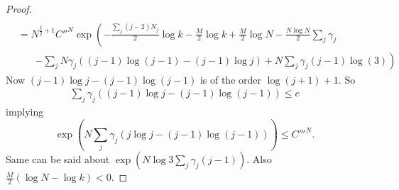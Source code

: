 \documentclass[12pt]{article}
\numberwithin{equation}{section}
\numberwithin{equation}{section}
\theoremstyle{definition}
\renewcommand{\1}{\bf 1}
\begin{document}
\begin{proof}
\begin{equation}
\begin{split}
\\
&= N^{\frac{\xi}{2}+1}  C''^{N} \exp\left(- \frac{\sum_{j}(j-2)N_{j}}{2}\log k - \frac{M}{2}\log k +\frac{M}{2}\log N - \frac{N\log N}{2} \sum_{j} \gamma_{j}\right.\\
&~~~~~~~~\left. - \sum_{j} N \gamma_{j}\left((j-1)\log(j-1) - (j-1)\log j  \right)  + N \sum_{j}\gamma_{j}(j-1)\log(3)\right)
\end{split}
\end{equation}
Now $(j-1)\log j -(j-1)\log(j-1)$ is of the order $\log(j+1) +1$. So
\begin{equation}
\begin{split}
\sum_{j}\gamma_{j}\left( (j-1)\log j - (j-1)\log (j-1) \right)\le c
\end{split}
\end{equation} 
implying 
\[
\exp\left( N \sum_{j} \gamma_{j}\left( j\log j - (j-1)\log(j-1) \right) \right)\le C'''^{N}.
\]
Same can be said about $\exp\left( N\log 3 \sum_{j}\gamma_{j}(j-1) \right)$. Also $\frac{M}{2}\left( \log N - \log k \right)<0$. 


\end{proof}
\end{document}
